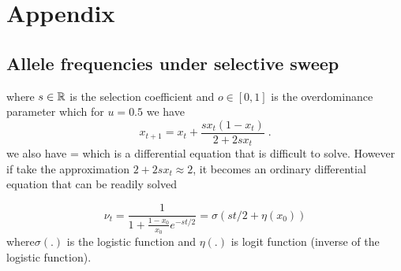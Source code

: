 \documentclass[11pt]{article}
\begin{document}
\newpage


%
%
%
%
%
%

\clearpage
\setcounter{figure}{0}
\setcounter{table}{0}
\setcounter{equation}{0}
\renewcommand{\thefigure}{S\arabic{figure}}
\renewcommand{\thetable}{S\arabic{table}}
\renewcommand{\theequation}{S\arabic{equation}}



\section{Appendix}
\subsection{Allele frequencies under selective sweep} \label{app:af}

\beq
\eeq
where $s\in {\mathbb R}$ is the selection coefficient and $o\in[0,1]$ is the 
overdominance parameter which for $u=0.5$ we have
\begin{equation}
x_{t+1}=x_t+\frac{sx_t(1-x_t)}{2+2sx_t}\;.
\label{eq:transition}
\end{equation}
we also have
\beq
{} = 
\eeq
which is a differential equation that is difficult to solve. However if take 
the approximation $2+2sx_t \approx 2$, it becomes an ordinary differential 
equation that can be readily solved

\begin{equation}
\nu_t =\frac{1}{1+\frac{1-x_0}{x_0}e^{-st/2}} = \sigma(st/2+\eta(x_0)) 
\label{eq:inf-pop}
\end{equation}
where$\sigma(.)$ is the logistic
function and $\eta(.)$ is logit function (inverse of the logistic function). 
\end{document}
